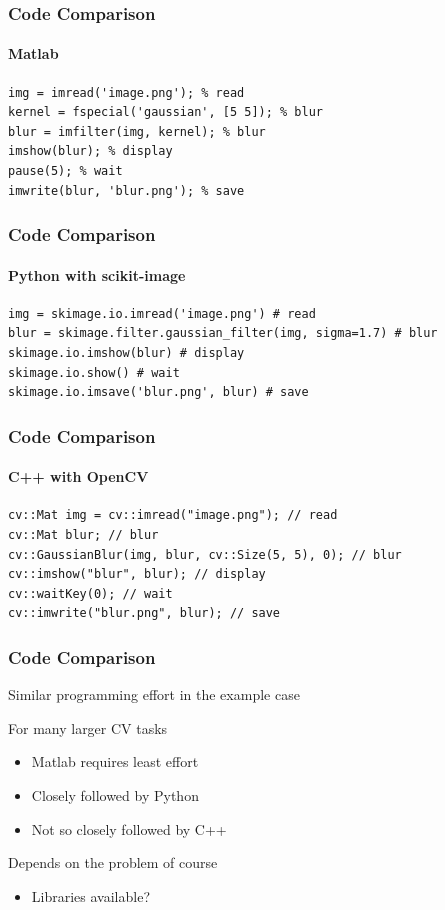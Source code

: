 \documentclass[xetex,professionalfont]{beamer}
\begin{document}

\begin{frame}[fragile]
\frametitle{Code Comparison}
\framesubtitle{Matlab}

\begin{verbatim}
img = imread('image.png'); % read
kernel = fspecial('gaussian', [5 5]); % blur
blur = imfilter(img, kernel); % blur
imshow(blur); % display
pause(5); % wait
imwrite(blur, 'blur.png'); % save
\end{verbatim}

\end{frame}


\begin{frame}[fragile]
\frametitle{Code Comparison}
\framesubtitle{Python with scikit-image}

\begin{verbatim}
img = skimage.io.imread('image.png') # read
blur = skimage.filter.gaussian_filter(img, sigma=1.7) # blur
skimage.io.imshow(blur) # display
skimage.io.show() # wait
skimage.io.imsave('blur.png', blur) # save
\end{verbatim}

\end{frame}


\begin{frame}[fragile]
\frametitle{Code Comparison}
\framesubtitle{C++ with OpenCV}

\begin{verbatim}
cv::Mat img = cv::imread("image.png"); // read
cv::Mat blur; // blur
cv::GaussianBlur(img, blur, cv::Size(5, 5), 0); // blur
cv::imshow("blur", blur); // display
cv::waitKey(0); // wait
cv::imwrite("blur.png", blur); // save
\end{verbatim}

\end{frame}


\begin{frame}
\frametitle{Code Comparison}

Similar programming effort in the example case

\medskip
For many larger CV tasks
\begin{itemize}
	\item Matlab requires least effort
	\item Closely followed by Python
	\item Not so closely followed by C++
\end{itemize}

\medskip
Depends on the problem of course
\begin{itemize}
	\item Libraries available?
\end{itemize}

\end{frame}
\end{document}
